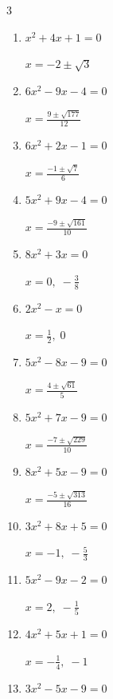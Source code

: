 \begin{multicols}{3}
\begin{enumerate}
  \item $x^{2}+4x+1=0$

        $\displaystyle x=-2\pm \sqrt{3}$

\columnbreak %

\resetques

  \item $6x^{2}-9x-4=0$

        $\displaystyle x=\frac{9\pm \sqrt{177}}{12}$

  \item $6x^{2}+2x-1=0$

        $\displaystyle x=\frac{-1\pm \sqrt{7}}{6}$

  \item $5x^{2}+9x-4=0$

        $\displaystyle x=\frac{-9\pm \sqrt{161}}{10}$

  \item $8x^{2}+3x=0$

        $\displaystyle x=0, \; -\frac{3}{8}$

  \item $2x^{2}-x=0$

        $\displaystyle x=\frac{1}{2}, \; 0$

  \item $5x^{2}-8x-9=0$

        $\displaystyle x=\frac{4\pm \sqrt{61}}{5}$

  \item $5x^{2}+7x-9=0$

        $\displaystyle x=\frac{-7\pm \sqrt{229}}{10}$

\columnbreak %

  \item $8x^{2}+5x-9=0$

        $\displaystyle x=\frac{-5\pm \sqrt{313}}{16}$

  \item $3x^{2}+8x+5=0$

        $\displaystyle x=-1, \; -\frac{5}{3}$

  \item $5x^{2}-9x-2=0$

        $\displaystyle x=2, \; -\frac{1}{5}$

  \item $4x^{2}+5x+1=0$

        $\displaystyle x=-\frac{1}{4}, \; -1$

  \item $3x^{2}-5x-9=0$


\end{enumerate}
\end{multicols}

